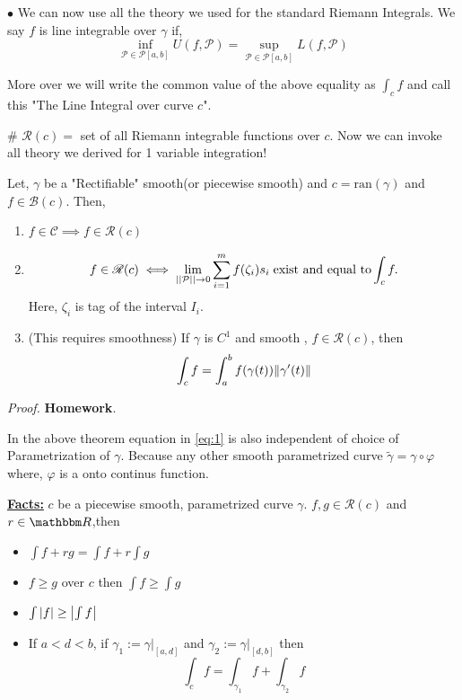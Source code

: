 \documentclass[Analysis-3]{subfiles}
\begin{document}
$\bullet$ We can now use all the theory we used for the standard Riemann Integrals. We say $f$ is line integrable over $\gamma$ if,
\[\inf_{\mathcal{P} \in \mathscr{P}[a,b]} U(f,\mathcal{P}) = \sup_{\mathcal{P} \in \mathscr{P}[a,b]} L(f,\mathcal{P})\]

More over we will write the common value of the above equality as $\int_c f$ and call this "The Line Integral over curve $c$".

\# \textbf{$\mathscr{R}(c)=$} set of all Riemann integrable functions over $c$. Now we can invoke all theory we derived for 1 variable integration!

\begin{Thm}{}{}\label{thm1:23}
    Let, $\gamma$ be a "Rectifiable" smooth(or piecewise smooth) and $c = \text{ran}(\gamma)$ and $f \in \mathscr{B}(c)$. Then,
    \begin{enumerate}
        \item $f \in \mathscr{C} \implies f \in \mathscr{R}(c)$
        \item \[ f \in \mathscr{R}(c) \iff \lim_{||\mathcal{P}||\to 0} \sum_{i=1}^{m} f(\zeta_i)s_i \hspace{0.1cm} \text{exist and equal to}\int_c f.\] Here, $\zeta_i$ is tag of the interval $I_i$.

        \item (This requires smoothness) If $\gamma$ is $C^1$ and smooth , $f \in \mathscr{R}(c)$, then
              \[\int_c f = \int_a^b f(\gamma(t))\norm{\gamma'(t)} \label{eq:1}\]

    \end{enumerate}
\end{Thm}

\textit{Proof.} \textbf{Homework}.

\vspace{0.2cm}

In the above theorem equation in \ref{eq:1} is also independent of choice of Parametrization of $\gamma$. Because any other smooth parametrized curve $\tilde{\gamma} = \gamma \circ \varphi$ where, $\varphi$ is a onto continus function.

\vspace{1cm}

\textbf{\underline{Facts:}} $c$ be a piecewise smooth, parametrized curve $\gamma$. $f,g \in \mathscr{R}(c)$ and $r \in \R$,then
\begin{itemize}
    \item $\int f+rg = \int f + r\int g $
    \item $f \ge g$ over $c$ then $\int f \ge \int g$
    \item $\int \abs{f} \ge \abs{\int f}$
    \item If $a<d<b$, if $\gamma_1 := \gamma |_{[a,d]}$ and $\gamma_2 := \gamma |_{[d,b]}$ then
          \[\int_c f = \int_{\gamma_1}f + \int_{\gamma_2} f \]
\end{itemize}
\end{document}
